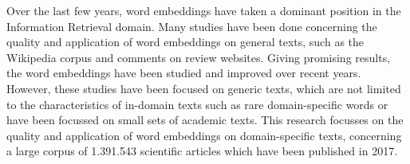 \documentclass[../../Thesis.tex]{subfiles}
\begin{document}
Over the last few years, word embeddings have taken a dominant position in the Information Retrieval domain. Many studies have been done concerning the quality and application of word embeddings on general texts, such as the Wikipedia corpus and comments on review websites. Giving promising results, the word embeddings have been studied and improved over recent years. However, these studies have been focused on generic texts, which are not limited to the characteristics of in-domain texts such as rare domain-specific words or have been focussed on small sets of academic texts. This research focusses on the quality and application of word embeddings on domain-specific texts, concerning a large corpus of 1.391.543 scientific articles which have been published in 2017.
\end{document}
